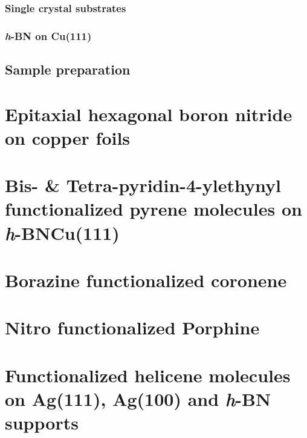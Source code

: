 \documentclass[
twoside,				%
BCOR=12mm,				%
headings=normal,		%
headsepline,			%
footsepline,			%
plainfootsepline,		%
]{scrbook}
\begin{document}
     \subsection{Single crystal substrates}
        

     \subsection{\textit{h}-BN on Cu(111)}
		

  \section{Sample preparation}
    

\chapter{Epitaxial hexagonal boron nitride on copper foils}
%


\chapter{Bis- \& Tetra-pyridin-4-ylethynyl functionalized pyrene molecules on \textit{h}-BN\/Cu(111)}


\chapter{Borazine functionalized coronene}


\chapter{Nitro functionalized Porphine}
    

\chapter{Functionalized helicene molecules on Ag(111), Ag(100) and \textit{h}-BN supports}


\end{document}
